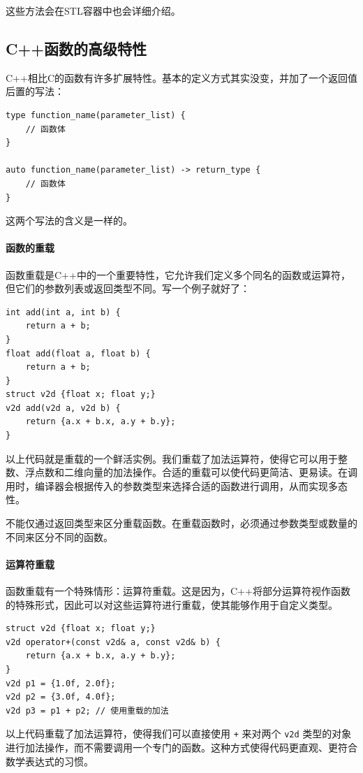 这些方法会在STL容器中也会详细介绍。

\subsection{C++函数的高级特性}

C++相比C的函数有许多扩展特性。基本的定义方式其实没变，并加了一个返回值后置的写法：
\begin{verbatim}
type function_name(parameter_list) {
    // 函数体
}

auto function_name(parameter_list) -> return_type {
    // 函数体
}
\end{verbatim}
这两个写法的含义是一样的。

\paragraph{函数的重载}

函数重载是C++中的一个重要特性，它允许我们定义多个同名的函数或运算符，但它们的参数列表或返回类型不同。写一个例子就好了：

\begin{verbatim}
int add(int a, int b) {
    return a + b;
}
float add(float a, float b) {
    return a + b;
}
struct v2d {float x; float y;}
v2d add(v2d a, v2d b) {
    return {a.x + b.x, a.y + b.y};
}
\end{verbatim}
以上代码就是重载的一个鲜活实例。我们重载了加法运算符，使得它可以用于整数、浮点数和二维向量的加法操作。合适的重载可以使代码更简洁、更易读。在调用时，编译器会根据传入的参数类型来选择合适的函数进行调用，从而实现多态性。

不能仅通过返回类型来区分重载函数。在重载函数时，必须通过参数类型或数量的不同来区分不同的函数。

\paragraph{运算符重载}

函数重载有一个特殊情形：运算符重载。这是因为，C++将部分运算符视作函数的特殊形式，因此可以对这些运算符进行重载，使其能够作用于自定义类型。
\begin{verbatim}
struct v2d {float x; float y;}
v2d operator+(const v2d& a, const v2d& b) {
    return {a.x + b.x, a.y + b.y};
}
v2d p1 = {1.0f, 2.0f};
v2d p2 = {3.0f, 4.0f};
v2d p3 = p1 + p2; // 使用重载的加法
\end{verbatim}
以上代码重载了加法运算符，使得我们可以直接使用 \verb|+| 来对两个 \verb|v2d| 类型的对象进行加法操作，而不需要调用一个专门的函数。这种方式使得代码更直观、更符合数学表达式的习惯。

